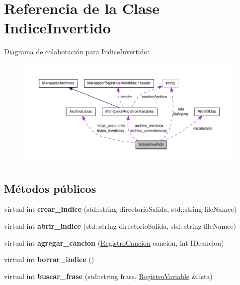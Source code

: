 \hypertarget{class_indice_invertido}{\section{\-Referencia de la \-Clase \-Indice\-Invertido}
\label{class_indice_invertido}
}


\-Diagrama de colaboración para \-Indice\-Invertido\-:
\nopagebreak
\begin{figure}[H]
\begin{center}
\leavevmode
\includegraphics[width=350pt]{class_indice_invertido__coll__graph}
\end{center}
\end{figure}
\subsection*{\-Métodos públicos}
\begin{DoxyCompactItemize}
\item 
\hypertarget{class_indice_invertido_a417ca8edbb37599e3eaa0f1c1c31a6af}{virtual int {\bfseries crear\-\_\-indice} (std\-::string directorio\-Salida, std\-::string file\-Namee)}\label{class_indice_invertido_a417ca8edbb37599e3eaa0f1c1c31a6af}

\item 
\hypertarget{class_indice_invertido_ac1bbd192dbdc750ed04a2585b5f5eac0}{virtual int {\bfseries abrir\-\_\-indice} (std\-::string directorio\-Salida, std\-::string file\-Namee)}\label{class_indice_invertido_ac1bbd192dbdc750ed04a2585b5f5eac0}

\item 
\hypertarget{class_indice_invertido_a994742b0fa4811e9a11f8c7f44d7e78d}{virtual int {\bfseries agregar\-\_\-cancion} (\hyperlink{class_registro_cancion}{\-Registro\-Cancion} cancion, int \-I\-Dcancion)}\label{class_indice_invertido_a994742b0fa4811e9a11f8c7f44d7e78d}

\item 
\hypertarget{class_indice_invertido_abd2924430eec5374e4fdf6f5ba5095d1}{virtual int {\bfseries borrar\-\_\-indice} ()}\label{class_indice_invertido_abd2924430eec5374e4fdf6f5ba5095d1}

\item 
\hypertarget{class_indice_invertido_ac7c4676f97e8ce72503aff69530cc50e}{virtual int {\bfseries buscar\-\_\-frase} (std\-::string frase, \hyperlink{class_registro_variable}{\-Registro\-Variable} \&lista)}\label{class_indice_invertido_ac7c4676f97e8ce72503aff69530cc50e}

\end{DoxyCompactItemize}

